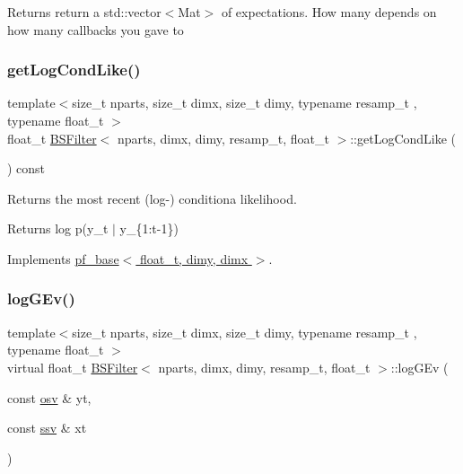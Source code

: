 \begin{DoxyReturn}{Returns}
return a std\+::vector$<$\+Mat$>$ of expectations. How many depends on how many callbacks you gave to 
\end{DoxyReturn}
\mbox{\label{classBSFilter_a6ab6ad2b7b5bd26d8f57af71e560f0a7}} 
\subsubsection{\texorpdfstring{get\+Log\+Cond\+Like()}{getLogCondLike()}}
{\footnotesize\ttfamily template$<$size\+\_\+t nparts, size\+\_\+t dimx, size\+\_\+t dimy, typename resamp\+\_\+t , typename float\+\_\+t $>$ \\
float\+\_\+t \hyperlink{classBSFilter}{B\+S\+Filter}$<$ nparts, dimx, dimy, resamp\+\_\+t, float\+\_\+t $>$\+::get\+Log\+Cond\+Like (\begin{DoxyParamCaption}{ }\end{DoxyParamCaption}) const\hspace{0.3cm}{\ttfamily [virtual]}}



Returns the most recent (log-\/) conditiona likelihood. 

\begin{DoxyReturn}{Returns}
log p(y\+\_\+t $\vert$ y\+\_\+\{1\+:t-\/1\}) 
\end{DoxyReturn}


Implements \hyperlink{classpf__base_a350df818820d6ab0fd6d413022b7f23b}{pf\+\_\+base$<$ float\+\_\+t, dimy, dimx $>$}.

\mbox{\label{classBSFilter_ae7ef5c414525879235f1e3b72833ced5}} 
\subsubsection{\texorpdfstring{log\+G\+Ev()}{logGEv()}}
{\footnotesize\ttfamily template$<$size\+\_\+t nparts, size\+\_\+t dimx, size\+\_\+t dimy, typename resamp\+\_\+t , typename float\+\_\+t $>$ \\
virtual float\+\_\+t \hyperlink{classBSFilter}{B\+S\+Filter}$<$ nparts, dimx, dimy, resamp\+\_\+t, float\+\_\+t $>$\+::log\+G\+Ev (\begin{DoxyParamCaption}\item[{const \hyperlink{classBSFilter_ad8512328484d7c7bd7a3b7a9481d7f37}{osv} \&}]{yt,  }\item[{const \hyperlink{classBSFilter_a0b5bc93957fb6b6b1282f31fa2e01c3c}{ssv} \&}]{xt }\end{DoxyParamCaption})\hspace{0.3cm}{\ttfamily [pure virtual]}}



